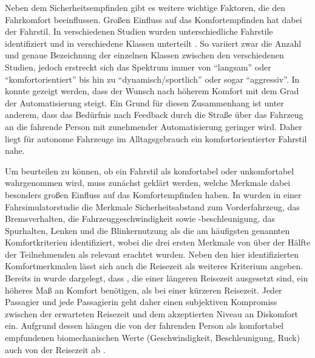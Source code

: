 Neben dem Sicherheitsempfinden gibt es weitere wichtige Faktoren, die den Fahrkomfort beeinflussen. Großen Einfluss auf das Komfortempfinden hat dabei der Fahrstil. In verschiedenen Studien wurden unterschiedliche Fahrstile identifiziert und in verschiedene Klassen unterteilt \cite{Abendroth.2012,Bellem.2016,Murphey.30.03.200902.04.2009}. So variiert zwar die Anzahl und genaue Bezeichnung der einzelnen Klassen zwischen den verschiedenen Studien, jedoch erstreckt sich das Spektrum immer von ``langsam'' oder ``komfortorientiert'' bis hin zu ``dynamisch/sportlich'' oder sogar ``aggressiv''. In \cite{Lange.2014} konnte gezeigt werden, dass der Wunsch nach höherem Komfort mit dem Grad der Automatisierung steigt. Ein Grund für diesen Zusammenhang ist unter anderem, dass das Bedürfnis nach Feedback durch die Straße über das Fahrzeug an die fahrende Person mit zunehmender Automatisierung geringer wird. Daher liegt für autonome Fahrzeuge im Alltagsgebrauch ein komfortorientierter Fahrstil nahe. 

Um beurteilen zu können, ob ein Fahrstil als komfortabel oder unkomfortabel wahrgenommen wird, muss zunächst geklärt werden, welche Merkmale dabei besonders großen Einfluss auf das Komfortempfinden haben. In \cite{Scherer.2015} wurden in einer Fahrsimulatorstudie die Merkmale Sicherheitsabstand zum Vorderfahrzeug, das Bremsverhalten, die Fahrzeuggeschwindigkeit sowie -beschleunigung, das Spurhalten, Lenken und die Blinkernutzung als die am häufigsten genannten Komfortkriterien identifiziert, wobei die drei ersten Merkmale von über der Hälfte der Teilnehmenden als relevant erachtet wurden. Neben den hier identifizierten Komfortmerkmalen lässt sich auch die Reisezeit als weiteres Kriterium angeben. Bereits in \cite{Oborne.1978} wurde dargelegt, dass , die einer längeren Reisezeit ausgesetzt sind, ein höheres Maß an Komfort benötigen, als bei einer kürzeren Reisezeit. Jeder Passagier und jede Passagierin geht daher einen subjektiven Kompromiss zwischen der erwarteten Reisezeit und dem akzeptierten Niveau an Diskomfort ein. Aufgrund dessen hängen die von der fahrenden Person als komfortabel empfundenen biomechanischen Werte (Geschwindigkeit, Beschleunigung, Ruck) auch von der Reisezeit ab \cite{Festner.2019}.

